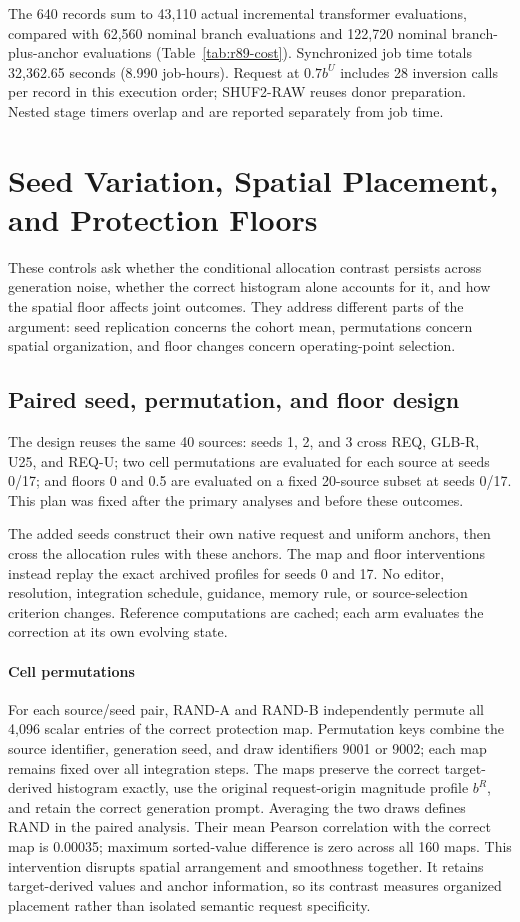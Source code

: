 \documentclass[10pt,doubleanonymous]{ieeeconf}
\begin{document}
The 640 records sum to 43,110 actual incremental transformer evaluations, compared with 62,560 nominal branch evaluations and 122,720 nominal branch-plus-anchor evaluations (Table~\ref{tab:r89-cost}). Synchronized job time totals 32,362.65 seconds (8.990 job-hours). Request at $0.7b^U$ includes 28 inversion calls per record in this execution order; SHUF2-RAW reuses donor preparation. Nested stage timers overlap and are reported separately from job time.

\section{Seed Variation, Spatial Placement, and Protection Floors}
\label{sec:r91}
These controls ask whether the conditional allocation contrast persists across generation noise, whether the correct histogram alone accounts for it, and how the spatial floor affects joint outcomes. They address different parts of the argument: seed replication concerns the cohort mean, permutations concern spatial organization, and floor changes concern operating-point selection.
\subsection{Paired seed, permutation, and floor design}
The design reuses the same 40 sources: seeds 1, 2, and 3 cross REQ, GLB-R, U25, and REQ-U; two cell permutations are evaluated for each source at seeds 0/17; and floors 0 and 0.5 are evaluated on a fixed 20-source subset at seeds 0/17. This plan was fixed after the primary analyses and before these outcomes.

The added seeds construct their own native request and uniform anchors, then cross the allocation rules with these anchors. The map and floor interventions instead replay the exact archived profiles for seeds 0 and 17. No editor, resolution, integration schedule, guidance, memory rule, or source-selection criterion changes. Reference computations are cached; each arm evaluates the correction at its own evolving state.

\paragraph{Cell permutations}
For each source/seed pair, RAND-A and RAND-B independently permute all 4,096 scalar entries of the correct protection map. Permutation keys combine the source identifier, generation seed, and draw identifiers 9001 or 9002; each map remains fixed over all integration steps. The maps preserve the correct target-derived histogram exactly, use the original request-origin magnitude profile $b^R$, and retain the correct generation prompt. Averaging the two draws defines RAND in the paired analysis. Their mean Pearson correlation with the correct map is 0.00035; maximum sorted-value difference is zero across all 160 maps. This intervention disrupts spatial arrangement and smoothness together. It retains target-derived values and anchor information, so its contrast measures organized placement rather than isolated semantic request specificity.
\end{document}
